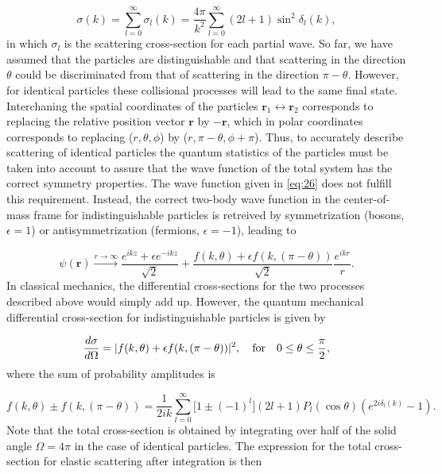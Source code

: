 \begin{equation}
\sigma(k)= \sum_{l=0}^{\infty} \sigma_l(k) = \frac{4\pi}{k^2}\sum_{l=0}^{\infty}(2l+1)\sin^2\delta_l(k),
\end{equation}
in which $\sigma_l$ is the scattering cross-section for each partial wave. So far, we have assumed that the particles are distinguishable and that scattering in the direction $\theta$ could be discriminated from that of scattering in the direction $\pi-\theta$. However, for identical particles these collisional processes will lead to the same final state. Interchaning the spatial coordinates of the particles $\mathbf{r}_1 \leftrightarrow \mathbf{r}_2$ corresponds to replacing the relative position vector $\mathbf{r}$ by $-\mathbf{r}$, which in polar coordinates corresponds to replacing ($r,\theta,\phi$) by ($r,\pi-\theta,\phi+\pi$). Thus, to accurately describe scattering of identical particles the quantum statistics of the particles must be taken into account to assure that the wave function of the total system has the correct symmetry properties. The wave function given in \eqref{eq:26} does not fulfill this requirement. Instead, the correct two-body wave function in the center-of-mass frame for indistinguishable particles is retreived by symmetrization (bosons, $\epsilon = 1$) or antisymmetrization (fermions, $\epsilon = -1$), leading to

\begin{equation}
\psi(\mathbf{r}) \xrightarrow{r \to \infty} \frac{e^{ikz} + \epsilon e^{-ikz}}{\sqrt{2}} + \frac{f(k,\theta)+\epsilon f(k,(\pi-\theta))}{\sqrt{2}}\frac{e^{ikr}}{r}.
\end{equation}
In classical mechanics, the differential cross-sections for the two processes described above would simply add up. However, the quantum mechanical differential cross-section for indistinguishable particles is given by

\begin{equation}
\frac{d\sigma}{d\Omega} = \lvert f(k,\theta)+\epsilon f(k,(\pi-\theta))\rvert^2, \quad \text{for} \quad 0 \leq \theta \leq \frac{\pi}{2},
\end{equation}
where the sum of probability amplitudes is

\begin{equation}
f(k,\theta) \pm f(k,(\pi-\theta)) = \frac{1}{2ik}\sum_{l=0}^{\infty} \big[1 \pm (-1)^l\big](2l+1)P_l(\cos\theta)(e^{2i\delta_l(k)} - 1).
\end{equation}
Note that the total cross-section is obtained by integrating over half of the solid angle $\Omega =4\pi$ in the case of identical particles. The expression for the total cross-section for elastic scattering after integration is then

